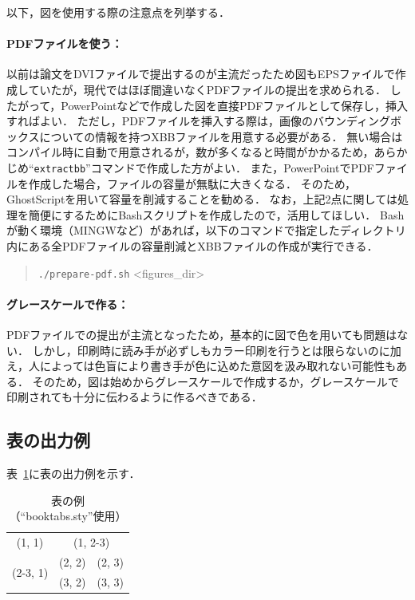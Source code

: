 \documentclass[lualatex]{ipsj}
\newcommand{\Tab}[1]{表~#1}
\begin{document}
  以下，図を使用する際の注意点を列挙する．
  
    \paragraph{PDFファイルを使う：}
    以前は論文をDVIファイルで提出するのが主流だったため図もEPSファイルで作成していたが，現代ではほぼ間違いなくPDFファイルの提出を求められる．
    したがって，PowerPointなどで作成した図を直接PDFファイルとして保存し，挿入すればよい．
    ただし，PDFファイルを挿入する際は，画像のバウンディングボックスについての情報を持つXBBファイルを用意する必要がある．
    無い場合はコンパイル時に自動で用意されるが，数が多くなると時間がかかるため，あらかじめ``\texttt{extractbb}''コマンドで作成した方がよい．
    また，PowerPointでPDFファイルを作成した場合，ファイルの容量が無駄に大きくなる．
    そのため，GhostScriptを用いて容量を削減することを勧める．
    なお，上記2点に関しては処理を簡便にするためにBashスクリプトを作成したので，活用してほしい．
    Bashが動く環境（MINGWなど）があれば，以下のコマンドで指定したディレクトリ内にある全PDFファイルの容量削減とXBBファイルの作成が実行できる．
      \begin{quote}
      \texttt{./prepare-pdf.sh} <figures\_dir>
      \end{quote}
    
    \paragraph{グレースケールで作る：}
    PDFファイルでの提出が主流となったため，基本的に図で色を用いても問題はない．
    しかし，印刷時に読み手が必ずしもカラー印刷を行うとは限らないのに加え，人によっては色盲により書き手が色に込めた意図を汲み取れない可能性もある．
    そのため，図は始めからグレースケールで作成するか，グレースケールで印刷されても十分に伝わるように作るべきである．
    
  \subsection{表の出力例}
  \Tab{\ref{tab:sample}}に表の出力例を示す．
  
    \begin{table}[t]
    \caption{表の例（``booktabs.sty''使用）}
    \label{tab:sample}
    \centering \small
      \begin{tabular}{ccc}
      \toprule
      (1, 1) & \multicolumn{2}{c}{(1, 2-3)} \\
      \cmidrule(r){1-1}\cmidrule(l){2-3}
      \multirow{2}{*}{(2-3, 1)} & (2, 2) & (2, 3) \\
      & (3, 2) & (3, 3) \\
      \bottomrule
      \end{tabular}
    \end{table}
  
\end{document}
